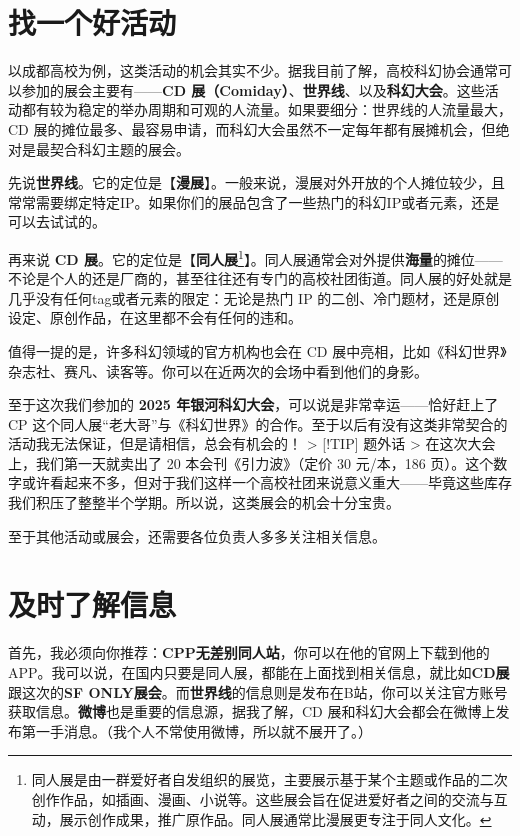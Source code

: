 \section{找一个好活动}\label{ux627eux4e00ux4e2aux597dux6d3bux52a8}

以成都高校为例，这类活动的机会其实不少。据我目前了解，高校科幻协会通常可以参加的展会主要有------\textbf{CD
展（Comiday）}、\textbf{世界线}、以及\textbf{科幻大会}。这些活动都有较为稳定的举办周期和可观的人流量。如果要细分：世界线的人流量最大，CD
展的摊位最多、最容易申请，而科幻大会虽然不一定每年都有展摊机会，但绝对是最契合科幻主题的展会。

先说\textbf{世界线}。它的定位是【\textbf{漫展}】。一般来说，漫展对外开放的个人摊位较少，且常常需要绑定特定IP。如果你们的展品包含了一些热门的科幻IP或者元素，还是可以去试试的。

再来说 \textbf{CD
展}。它的定位是【\textbf{同人展}\footnote{同人展是由一群爱好者自发组织的展览，主要展示基于某个主题或作品的二次创作作品，如插画、漫画、小说等。这些展会旨在促进爱好者之间的交流与互动，展示创作成果，推广原作品。同人展通常比漫展更专注于同人文化。}】。同人展通常会对外提供\textbf{海量}的摊位------不论是个人的还是厂商的，甚至往往还有专门的高校社团街道。同人展的好处就是几乎没有任何tag或者元素的限定：无论是热门
IP 的二创、冷门题材，还是原创设定、原创作品，在这里都不会有任何的违和。

值得一提的是，许多科幻领域的官方机构也会在 CD
展中亮相，比如《科幻世界》杂志社、赛凡、读客等。你可以在近两次的会场中看到他们的身影。

至于这次我们参加的 \textbf{2025
年银河科幻大会}，可以说是非常幸运------恰好赶上了 CP
这个同人展``老大哥''与《科幻世界》的合作。至于以后有没有这类非常契合的活动我无法保证，但是请相信，总会有机会的！
\textgreater{} {[}!TIP{]} 题外话 \textgreater{}
在这次大会上，我们第一天就卖出了 20 本会刊《引力波》（定价 30 元/本，186
页）。这个数字或许看起来不多，但对于我们这样一个高校社团来说意义重大------毕竟这些库存我们积压了整整半个学期。所以说，这类展会的机会十分宝贵。

至于其他活动或展会，还需要各位负责人多多关注相关信息。

\section{及时了解信息}\label{ux53caux65f6ux4e86ux89e3ux4fe1ux606f}

首先，我必须向你推荐：\textbf{CPP无差别同人站}，你可以在他的官网上下载到他的APP。我可以说，在国内只要是同人展，都能在上面找到相关信息，就比如\textbf{CD展}跟这次的\textbf{SF
ONLY展会}。而\textbf{世界线}的信息则是发布在B站，你可以关注官方账号获取信息。\textbf{微博}也是重要的信息源，据我了解，CD
展和科幻大会都会在微博上发布第一手消息。（我个人不常使用微博，所以就不展开了。）

